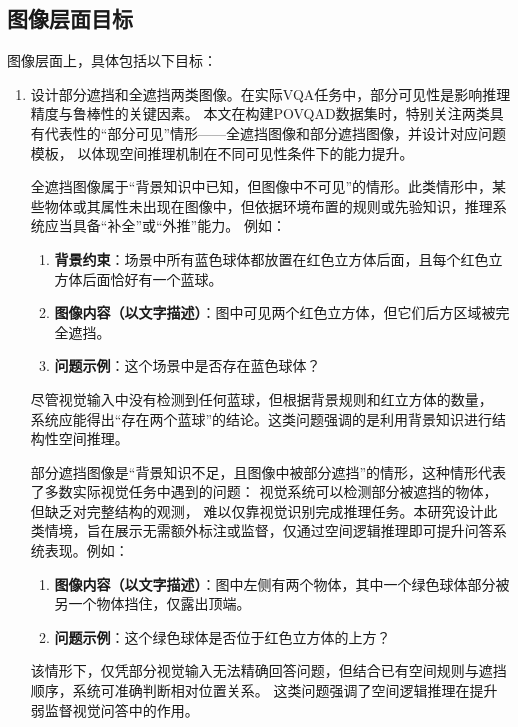 \subsection{图像层面目标}
图像层面上，具体包括以下目标：
\begin{enumerate}[nosep]
\item 设计部分遮挡和全遮挡两类图像。在实际VQA任务中，部分可见性是影响推理精度与鲁棒性的关键因素。
本文在构建POV\-QAD数据集时，特别关注两类具有代表性的“部分可见”情形——全遮挡图像和部分遮挡图像，并设计对应问题模板， 
以体现空间推理机制在不同可见性条件下的能力提升。

全遮挡图像属于“背景知识中已知，但图像中不可见”的情形。此类情形中，某些物体或其属性未出现在图像中，但依据环境布置的规则或先验知识，推理系统应当具备“补全”或“外推”能力。
例如：
\begin{enumerate}[nosep]
\item \textbf{背景约束}：场景中所有蓝色球体都放置在红色立方体后面，且每个红色立方体后面恰好有一个蓝球。
\item \textbf{图像内容（以文字描述）}：图中可见两个红色立方体，但它们后方区域被完全遮挡。
\item \textbf{问题示例}：这个场景中是否存在蓝色球体？
\end{enumerate}
尽管视觉输入中没有检测到任何蓝球，但根据背景规则和红立方体的数量，
系统应能得出“存在两个蓝球”的结论。这类问题强调的是利用背景知识进行结构性空间推理。

部分遮挡图像是“背景知识不足，且图像中被部分遮挡”的情形，这种情形代表了多数实际视觉任务中遇到的问题：
视觉系统可以检测部分被遮挡的物体，但缺乏对完整结构的观测，
难以仅靠视觉识别完成推理任务。本研究设计此类情境，旨在展示无需额外标注或监督，仅通过空间逻辑推理即可提升问答系统表现。例如：
\begin{enumerate}[nosep]
\item \textbf{图像内容（以文字描述）}：图中左侧有两个物体，其中一个绿色球体部分被另一个物体挡住，仅露出顶端。
\item \textbf{问题示例}：这个绿色球体是否位于红色立方体的上方？
\end{enumerate}
该情形下，仅凭部分视觉输入无法精确回答问题，但结合已有空间规则与遮挡顺序，系统可准确判断相对位置关系。
这类问题强调了空间逻辑推理在提升弱监督视觉问答中的作用。


\end{enumerate}
